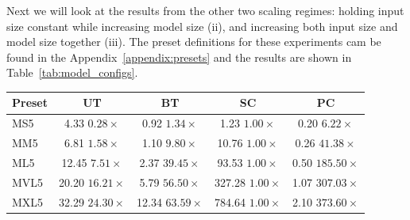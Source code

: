 Next we will look at the results from the other two scaling regimes: holding input size constant while increasing model size (ii), and increasing both input size and model size together (iii). The preset definitions for these experiments cam be found in the Appendix~\ref{appendix:presets} and the results are shown in Table~\ref{tab:model_configs}.




\begin{table}[h]
\centering

\begin{minipage}{0.49\textwidth}
\centering
\begin{tabular}{l c c c c}
\toprule
\textbf{Preset} & \textbf{UT} & \textbf{BT} & \textbf{SC} & \textbf{PC} \\
\midrule

MS5 & \makecell{4.33 \\ $0.28\times$}
    & \makecell{0.92 \\ $1.34\times$}
    & \makecell{1.23 \\ $1.00\times$}
    & \makecell{0.20 \\ $6.22\times$} \\

MM5 & \makecell{6.81 \\ $1.58\times$}
    & \makecell{1.10 \\ $9.80\times$}
    & \makecell{10.76 \\ $1.00\times$}
    & \makecell{0.26 \\ $41.38\times$} \\

ML5 & \makecell{12.45 \\ $7.51\times$}
    & \makecell{2.37 \\ $39.45\times$}
    & \makecell{93.53 \\ $1.00\times$}
    & \makecell{0.50 \\ $185.50\times$} \\

MVL5 & \makecell{20.20 \\ $16.21\times$}
     & \makecell{5.79 \\ $56.50\times$}
     & \makecell{327.28 \\ $1.00\times$}
     & \makecell{1.07 \\ $307.03\times$} \\

MXL5 & \makecell{32.29 \\ $24.30\times$}
     & \makecell{12.34 \\ $63.59\times$}
     & \makecell{784.64 \\ $1.00\times$}
     & \makecell{2.10 \\ $373.60\times$} \\



\end{tabular}
\end{minipage}
\end{table}
